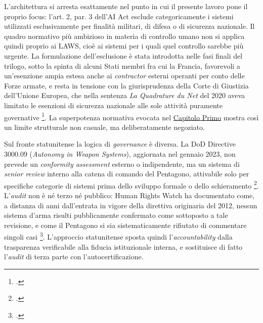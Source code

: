 \ifstampa\documentclass[a4paper,12pt,twoside,openright]{report}\else\documentclass[a4paper,12pt]{report}\fi
\begin{document}
L'architettura si arresta esattamente nel punto in cui il presente lavoro pone il
proprio focus: l'art. 2, par. 3 dell'AI Act esclude categoricamente i sistemi
utilizzati esclusivamente per finalità militari, di difesa o di sicurezza
nazionale. Il quadro normativo più ambizioso in materia di controllo umano non si
applica quindi proprio ai LAWS, cioè ai sistemi per i quali quel controllo
sarebbe più urgente. La formulazione dell'esclusione è stata introdotta nelle fasi
finali del trilogo, sotto la spinta di alcuni Stati membri fra cui la Francia,
favorevoli a un'esenzione ampia estesa anche ai \textit{contractor} esterni
operanti per conto delle Forze armate, e resta in tensione con la giurisprudenza
della Corte di Giustizia dell'Unione Europea, che nella sentenza \textit{La
Quadrature du Net} del 2020 aveva limitato le esenzioni di sicurezza nazionale
alle sole attività puramente governative
\footcite{vogiatzoglou_2024_ai_act_exception}. La superpotenza normativa evocata
nel \hyperref[cap1]{Capitolo Primo} mostra così un limite strutturale non casuale, ma
deliberatamente negoziato.

Sul fronte statunitense la logica di \textit{governance} è diversa. La DoD
Directive 3000.09 (\textit{Autonomy in Weapon Systems}), aggiornata nel gennaio
2023, non prevede un \textit{conformity assessment} esterno o indipendente, ma un
sistema di \textit{senior review} interno alla catena di comando del Pentagono,
attivabile solo per specifiche categorie di sistemi prima dello sviluppo formale
o dello schieramento \footcite{dod_directive_3000_09}. L'\textit{audit} non è né
terzo né pubblico: Human Rights Watch ha documentato come, a distanza di anni
dall'entrata in vigore della direttiva originaria del 2012, nessun sistema d'arma
risulti pubblicamente confermato come sottoposto a tale revisione, e come il
Pentagono si sia sistematicamente rifiutato di commentare singoli casi
\footcite{hrw_2023_dod3009review}. L'approccio statunitense sposta quindi
l'\textit{accountability} dalla trasparenza verificabile alla fiducia
istituzionale interna, e sostituisce di fatto l'\textit{audit} di terza parte con
l'autocertificazione.
\end{document}
